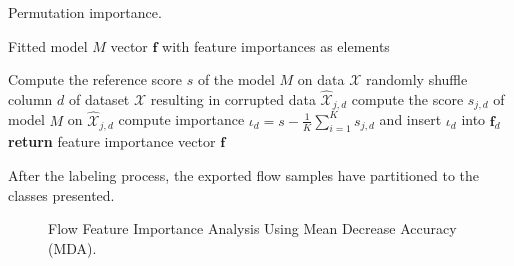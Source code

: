 \documentclass[../../main.tex]{subfiles}
\begin{document}
\begin{algorithm}[H]
    \caption[Permutation importance]{Permutation importance.}
    \label{alg:permutation_importance}
    \begin{algorithmic}[1]
        \REQUIRE Fitted model $M$
        \ENSURE vector $\bm{f}$ with feature importances as elements

        \STATE Compute the reference score $s$ of the model $M$ on data $\mathcal{X}$
                \STATE randomly shuffle column $d$ of dataset $\mathcal{X}$ resulting in corrupted data $\hat{\mathcal{X}}_{j,d}$
                \STATE compute the score $s_{j,d}$ of model $M$ on $\hat{\mathcal{X}}_{j,d}$
            \ENDFOR
            \STATE compute importance $\iota_d = s - \frac{1}{K} \sum\limits^K_{i=1} s_{j,d}$ and insert $\iota_d$ into $\bm{f}_d$
        \ENDFOR
        \STATE \textbf{return} feature importance vector $\bm{f}$
    \end{algorithmic}
 \end{algorithm}

 \begin{table}[H]
    \footnotesize
    \centering
    \setlength{\extrarowheight}{0pt}
    \addtolength{\extrarowheight}{\aboverulesep}
    \addtolength{\extrarowheight}{\belowrulesep}
    \setlength{\aboverulesep}{0pt}
    \setlength{\belowrulesep}{0pt}
    \setlength{\extrarowheight}{.1em}
     
    \caption[List of the preprocessed classes]{After the labeling process, the exported flow samples have partitioned to the classes presented.}
    \label{tab:preprocessed_flows}
\end{table}

\begin{figure}[H]
    \centering
    
    \caption[Flow feature importance analysis]{Flow Feature Importance Analysis Using Mean Decrease Accuracy (MDA).}
    \label{fig:feature_importances}
\end{figure}
\end{document}
